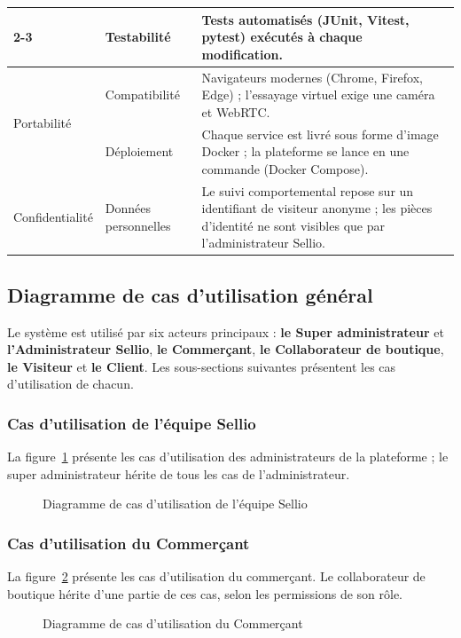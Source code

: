 \begin{longtable}{|p{3.2cm}|p{4cm}|p{8cm}|}
\cline{2-3}
 & Testabilité & Tests automatisés (JUnit, Vitest, pytest) exécutés à chaque modification. \\
\hline
\multirow{2}{*}{Portabilité} & Compatibilité & Navigateurs modernes (Chrome, Firefox, Edge) ; l'essayage virtuel exige une caméra et WebRTC. \\
\cline{2-3}
 & Déploiement & Chaque service est livré sous forme d'image Docker ; la plateforme se lance en une commande (Docker Compose). \\
\hline
Confidentialité & Données personnelles & Le suivi comportemental repose sur un identifiant de visiteur anonyme ; les pièces d'identité ne sont visibles que par l'administrateur Sellio. \\
\hline
\end{longtable}

\subsection{Diagramme de cas d'utilisation général}
Le système est utilisé par six acteurs principaux : \textbf{le Super administrateur} et \textbf{l'Administrateur Sellio}, \textbf{le Commerçant}, \textbf{le Collaborateur de boutique}, \textbf{le Visiteur} et \textbf{le Client}. Les sous-sections suivantes présentent les cas d'utilisation de chacun.

\subsubsection{Cas d'utilisation de l'équipe Sellio}
La figure~\ref{fig:cu-admin} présente les cas d'utilisation des administrateurs de la plateforme ; le super administrateur hérite de tous les cas de l'administrateur.
\begin{figure}[H]
    \centering
    \caption{Diagramme de cas d'utilisation de l'équipe Sellio}
    \label{fig:cu-admin}
\end{figure}

\subsubsection{Cas d'utilisation du Commerçant}
La figure~\ref{fig:cu-commercant} présente les cas d'utilisation du commerçant. Le collaborateur de boutique hérite d'une partie de ces cas, selon les permissions de son rôle.
\begin{figure}[H]
    \centering
    \caption{Diagramme de cas d'utilisation du Commerçant}
    \label{fig:cu-commercant}
\end{figure}

